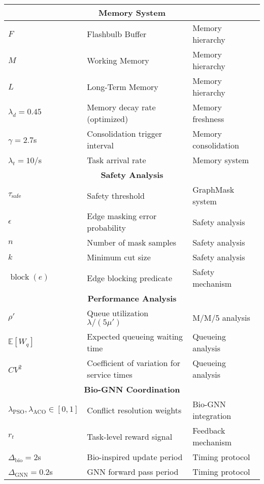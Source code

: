 \documentclass{article}
\begin{document}
\begin{longtable}{|p{2.5cm}|p{6cm}|p{3.5cm}|}
\multicolumn{3}{|c|}{\textbf{Memory System}} \\
\hline
$F$ & Flashbulb Buffer & Memory hierarchy \\
$M$ & Working Memory & Memory hierarchy \\
$L$ & Long-Term Memory & Memory hierarchy \\
$\lambda_d = 0.45$ & Memory decay rate (optimized) & Memory freshness \\
$\gamma = 2.7$s & Consolidation trigger interval & Memory consolidation \\
$\lambda_t = 10/$s & Task arrival rate & Memory system \\
\hline

\multicolumn{3}{|c|}{\textbf{Safety Analysis}} \\
\hline
$\tau_{\text{safe}}$ & Safety threshold & GraphMask system \\
$\epsilon$ & Edge masking error probability & Safety analysis \\
$n$ & Number of mask samples & Safety analysis \\
$k$ & Minimum cut size & Safety analysis \\
$\operatorname{block}(e)$ & Edge blocking predicate & Safety mechanism \\
\hline

\multicolumn{3}{|c|}{\textbf{Performance Analysis}} \\
\hline
$\rho'$ & Queue utilization $\lambda/(5\mu')$ & M/M/5 analysis \\
$\mathbb{E}[W_q]$ & Expected queueing waiting time & Queueing analysis \\
$CV^2$ & Coefficient of variation for service times & Queueing analysis \\
\hline

\multicolumn{3}{|c|}{\textbf{Bio-GNN Coordination}} \\
\hline
$\lambda_{\text{PSO}}, \lambda_{\text{ACO}} \in [0,1]$ & Conflict resolution weights & Bio-GNN integration \\
$r_t$ & Task-level reward signal & Feedback mechanism \\
$\Delta_{\text{bio}} = 2$s & Bio-inspired update period & Timing protocol \\
$\Delta_{\text{GNN}} = 0.2$s & GNN forward pass period & Timing protocol \\
\hline
\end{longtable}
\end{document}
